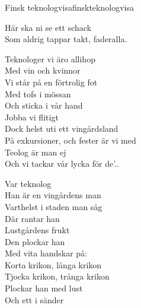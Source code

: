\begin{song}{Finsk teknologvisa}{finskteknologvisa}
\begin{vers}
Här ska ni se ett schack\\
Som aldrig tappar takt, faderalla.
\end{vers}
\begin{vers}
Teknologer vi äro allihop\\
Med vin och kvinnor\\%
Vi står på en förtrolig fot\\
Med tofs i mössan\\
Och sticka i vår hand\\
Jobba vi flitigt\\
Dock helst uti ett vingårdsland\\
På exkursioner, och fester är vi med\\
Teolog är man ej\\
Och vi tackar vår lycka för de'..\\
\end{vers}
\begin{vers}
\repopen Var teknolog\\
Han är en vingårdens man\\ %
Varthelst i staden man såg\\
Där rantar han\\ %
Lustgårdens frukt\\
Den plockar han\\ %
Med vita handskar på:\\
Korta krikon, långa krikon\\ %
Tjocka krikon, trånga krikon\\ %
Plockar han med lust\\ %
Och ett i sänder \repclose\\
\end{vers}
\end{song}
